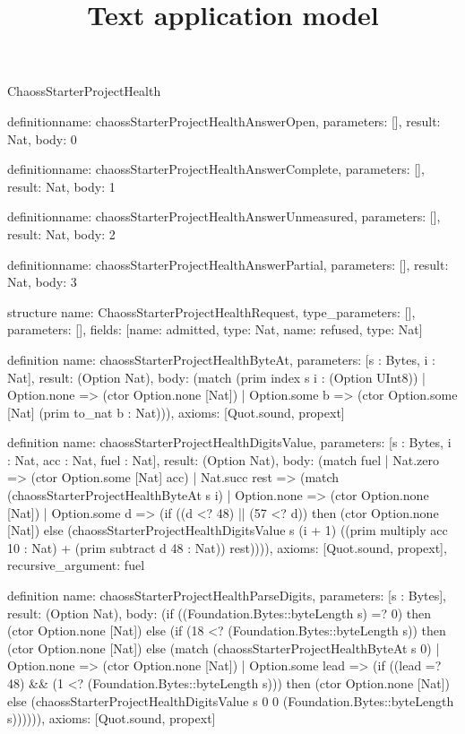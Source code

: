 \begin{lexlean}{ChaossStarterProjectHealth}
\title{Text application model}
\begin{semanticmodule}
definition{name: chaossStarterProjectHealthAnswerOpen, parameters: [], result: Nat, body: 0}

definition{name: chaossStarterProjectHealthAnswerComplete, parameters: [], result: Nat, body: 1}

definition{name: chaossStarterProjectHealthAnswerUnmeasured, parameters: [], result: Nat, body: 2}

definition{name: chaossStarterProjectHealthAnswerPartial, parameters: [], result: Nat, body: 3}

structure{
  name: ChaossStarterProjectHealthRequest,
  type_parameters: [],
  parameters: [],
  fields: [{name: admitted, type: Nat}, {name: refused, type: Nat}]
}

definition{
  name: chaossStarterProjectHealthByteAt,
  parameters: [s : Bytes, i : Nat],
  result: (Option Nat),
  body: (match (prim index s i : (Option UInt8))
    | Option.none => (ctor Option.none [Nat])
    | Option.some b => (ctor Option.some [Nat] (prim to_nat b : Nat))),
  axioms: [Quot.sound, propext]
}

definition{
  name: chaossStarterProjectHealthDigitsValue,
  parameters: [s : Bytes, i : Nat, acc : Nat, fuel : Nat],
  result: (Option Nat),
  body: (match fuel
    | Nat.zero => (ctor Option.some [Nat] acc)
    | Nat.succ rest => (match (chaossStarterProjectHealthByteAt s i)
      | Option.none => (ctor Option.none [Nat])
      | Option.some d => (if ((d <? 48) || (57 <? d)) then (ctor Option.none [Nat]) else (chaossStarterProjectHealthDigitsValue s (i + 1) ((prim multiply acc 10 : Nat) + (prim subtract d 48 : Nat)) rest)))),
  axioms: [Quot.sound, propext],
  recursive_argument: fuel
}

definition{
  name: chaossStarterProjectHealthParseDigits,
  parameters: [s : Bytes],
  result: (Option Nat),
  body: (if ((Foundation.Bytes::byteLength s) =? 0) then (ctor Option.none [Nat]) else (if (18 <? (Foundation.Bytes::byteLength s)) then (ctor Option.none [Nat]) else (match (chaossStarterProjectHealthByteAt s 0)
    | Option.none => (ctor Option.none [Nat])
    | Option.some lead => (if ((lead =? 48) && (1 <? (Foundation.Bytes::byteLength s))) then (ctor Option.none [Nat]) else (chaossStarterProjectHealthDigitsValue s 0 0 (Foundation.Bytes::byteLength s)))))),
  axioms: [Quot.sound, propext]
}


\end{semanticmodule}
\end{lexlean}
